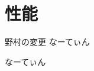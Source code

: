 \documentclass[report.tex]{subfiles}
\begin{document}
\section{性能}
野村の変更
なーてぃん

なーてぃん
\end{document}
